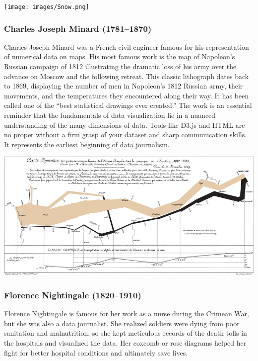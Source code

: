 \documentclass[]{book}
\begin{document}
\texttt{[image: images/Snow.png]}

\hypertarget{charles-joseph-minard-17811870}{%
\subsubsection{Charles Joseph Minard (1781--1870)}\label{charles-joseph-minard-17811870}}

Charles Joseph Minard was a French civil engineer famous for his representation of numerical data on maps. His most famous work is the map of Napoleon's Russian campaign of 1812 illustrating the dramatic loss of his army over the advance on Moscow and the following retreat. This classic lithograph dates back to 1869, displaying the number of men in Napoleon's 1812 Russian army, their movements, and the temperatures they encountered along their way. It has been called one of the ``best statistical drawings ever created.'' The work is an essential reminder that the fundamentals of data visualization lie in a nuanced understanding of the many dimensions of data. Tools like D3.js and HTML are no proper without a firm grasp of your dataset and sharp communication skills. It represents the earliest beginning of data journalism.

\includegraphics{images/Minard.png}

\hypertarget{florence-nightingale-18201910}{%
\subsubsection{Florence Nightingale (1820--1910)}\label{florence-nightingale-18201910}}

Florence Nightingale is famous for her work as a nurse during the Crimean War, but she was also a data journalist. She realized soldiers were dying from poor sanitation and malnutrition, so she kept meticulous records of the death tolls in the hospitals and visualized the data. Her coxcomb or rose diagrams helped her fight for better hospital conditions and ultimately save lives.
\end{document}
